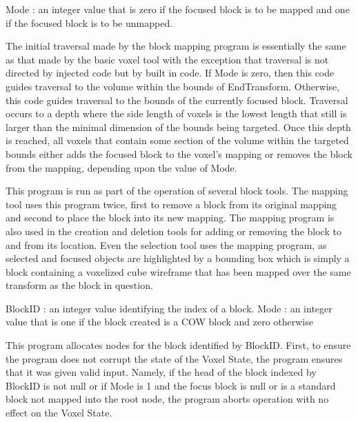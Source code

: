 \documentclass[onecolumn, draftclsnofoot,10pt, compsoc]{IEEEtran}
\newcounter{threesection}[subsubsection]
\newcounter{foursection}[threesection]
\begin{document}


Mode : an integer value that is zero if the focused block is to be mapped and one if the focused block is to be unmapped.


The initial traversal made by the block mapping program is essentially the same as that made by the basic voxel tool with the exception that traversal is not directed by injected code but by built in code. If Mode is zero, then this code guides traversal to the volume within the bounds of EndTransform. Otherwise, this code guides traversal to the bounds of the currently focused block. Traversal occurs to a depth where the side length of voxels is the lowest length that still is larger than the minimal dimension of the bounds being targeted. Once this depth is reached, all voxels that contain some section of the volume within the targeted bounds either adds the focused block to the voxel’s mapping or removes the block from the mapping, depending upon the value of Mode.


This program is run as part of the operation of several block tools. The mapping tool uses this program twice, first to remove a block from its original mapping and second to place the block into its new mapping. The mapping program is also used in the creation and deletion tools for adding or removing the block to and from its location. Even the selection tool uses the mapping program, as selected and focused objects are highlighted by a bounding box which is simply a block containing a voxelized cube wireframe that has been mapped over the same transform as the block in question.




BlockID : an integer value identifying the index of a block.
Mode : an integer value that is one if the block created is a COW block and zero otherwise


This program allocates nodes for the block identified by BlockID. First, to ensure the program does not corrupt the state of the Voxel State, the program ensures that it was given valid input. Namely, if the head of the block indexed by BlockID is not null or if Mode is 1 and the focus block is null or is a standard block not mapped into the root node, the program aborts operation with no effect on the Voxel State.
\end{document}
